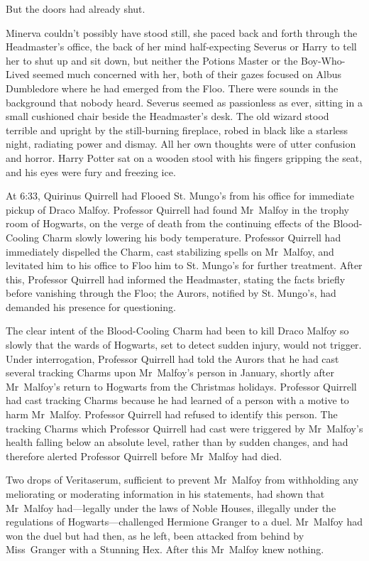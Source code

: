 But the doors had already shut.

\later

Minerva couldn’t possibly have stood still, she paced back and forth through the Headmaster’s office, the back of her mind half-expecting Severus or Harry to tell her to shut up and sit down, but neither the Potions Master or the Boy-Who-Lived seemed much concerned with her, both of their gazes focused on Albus Dumbledore where he had emerged from the Floo. There were sounds in the background that nobody heard. Severus seemed as passionless as ever, sitting in a small cushioned chair beside the Headmaster’s desk. The old wizard stood terrible and upright by the still-burning fireplace, robed in black like a starless night, radiating power and dismay. All her own thoughts were of utter confusion and horror. Harry Potter sat on a wooden stool with his fingers gripping the seat, and his eyes were fury and freezing ice.

At 6:33\am, Quirinus Quirrell had Flooed St. Mungo’s from his office for immediate pickup of Draco Malfoy. Professor Quirrell had found Mr~Malfoy in the trophy room of Hogwarts, on the verge of death from the continuing effects of the Blood-Cooling Charm slowly lowering his body temperature. Professor Quirrell had immediately dispelled the Charm, cast stabilizing spells on Mr~Malfoy, and levitated him to his office to Floo him to St. Mungo’s for further treatment. After this, Professor Quirrell had informed the Headmaster, stating the facts briefly before vanishing through the Floo; the Aurors, notified by St. Mungo’s, had demanded his presence for questioning.

The clear intent of the Blood-Cooling Charm had been to kill Draco Malfoy so slowly that the wards of Hogwarts, set to detect sudden injury, would not trigger. Under interrogation, Professor Quirrell had told the Aurors that he had cast several tracking Charms upon Mr~Malfoy’s person in January, shortly after Mr~Malfoy’s return to Hogwarts from the Christmas holidays. Professor Quirrell had cast tracking Charms because he had learned of a person with a motive to harm Mr~Malfoy. Professor Quirrell had refused to identify this person. The tracking Charms which Professor Quirrell had cast were triggered by Mr~Malfoy’s health falling below an absolute level, rather than by sudden changes, and had therefore alerted Professor Quirrell before Mr~Malfoy had died.

Two drops of Veritaserum, sufficient to prevent Mr~Malfoy from withholding any meliorating or moderating information in his statements, had shown that Mr~Malfoy had—legally under the laws of Noble Houses, illegally under the regulations of Hogwarts—challenged Hermione Granger to a duel. Mr~Malfoy had won the duel but had then, as he left, been attacked from behind by Miss~Granger with a Stunning Hex. After this Mr~Malfoy knew nothing.

